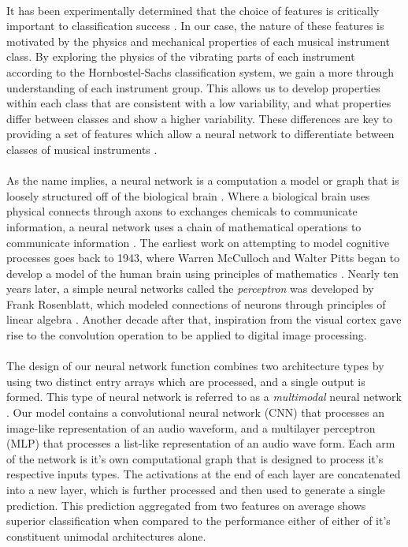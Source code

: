 \documentclass[12pt,letterpaper]{article}
\begin{document}
\paragraph*{}It has been experimentally determined that the choice of features is critically important to classification success \cite{Khan,Serizel}. In our case, the nature of these features is motivated by the physics and mechanical properties of each musical instrument class. By exploring the physics of the vibrating parts of each instrument according to the Hornbostel-Sachs classification system, we gain a more through understanding of each instrument group. This allows us to develop properties within each class that are consistent with a low variability, and what properties differ between classes and show a higher variability. These differences are key to providing a set of features which allow a neural network to differentiate between classes of musical instruments \cite{Liu,Zhang}. 

\paragraph*{}As the name implies, a neural network is a computation a model or graph that is loosely structured off of the biological brain \cite{Geron,Loy}. Where a biological brain uses physical connects through axons to exchanges chemicals to communicate information, a neural network uses a chain of mathematical operations to communicate information \cite{Goodfellow}. The earliest work on attempting to model cognitive processes goes back to 1943, where Warren McCulloch and Walter Pitts began to develop a model of the human brain using principles of mathematics \cite{McCulloch,Loy}. Nearly ten years later, a simple neural networks called the \textit{perceptron} was developed by Frank Rosenblatt, which modeled connections of neurons through principles of linear algebra \cite{Geron}. Another decade after that, inspiration from the visual cortex gave rise to the convolution operation to be applied to digital image processing. 

\paragraph*{}The design of our neural network function combines two architecture types by using two distinct entry arrays which are processed, and a single output is formed. This type of neural network is referred to as a \textit{multimodal} neural network \cite{Li,Ngiam}. Our model contains a convolutional neural network (CNN) that processes an image-like representation of an audio waveform, and a multilayer perceptron (MLP) that processes a list-like representation of an audio wave form. Each arm of the network is it's own computational graph that is designed to process it's respective inputs types. The activations at the end of each layer are concatenated into a new layer, which is further processed and then used to generate a single prediction. This prediction aggregated from two features on average shows superior classification when compared to the performance either of either of it's constituent unimodal architectures alone.
\end{document}
